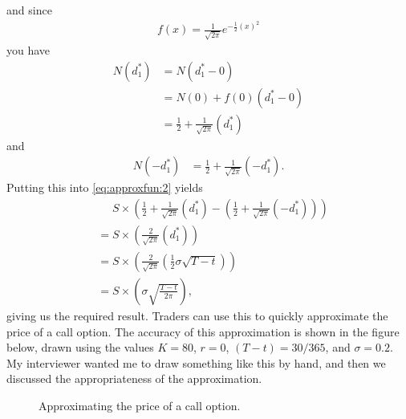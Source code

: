 \documentclass[11pt]{article}
\begin{document}
and since
\begin{align*}
f(x) =
     \frac{1}{ \sqrt{ 2\pi } }
     e^{ - \frac{1}{2} (x)^2 }
\end{align*}
you have
\begin{align*}
N(d_1^*)&= N(d_1^* - 0) \\
            &= N(0) + f(0)(d_1^* - 0) \\
            &= \frac{1}{2} +  \frac{1}{ \sqrt{ 2\pi } }
            (d_1^* )
\end{align*}
and
\begin{align*}
N(-d_1^*) &= \frac{1}{2} +  \frac{1}{ \sqrt{ 2\pi } } (- d_1^* )
\text{.}
\end{align*}
Putting this into \eqref{eq:approxfun:2} yields
\begin{align*}
&\phantom{{}={}}
S \times \left(
\frac{1}{2} +  \frac{1}{ \sqrt{ 2\pi } } ( d_1^* ) -
\left(
\frac{1}{2} +  \frac{1}{ \sqrt{ 2\pi } } (- d_1^* )
\right)
\right)
\\
&=
S \times \left(
    \frac{2}{ \sqrt{ 2\pi } } ( d_1^* )
\right)
\\
&=
S \times \left(
    \frac{ 2 }{ \sqrt{ 2 \pi } }
    \left(
    \frac{1}{2} \sigma \sqrt{T - t}
    \right)
\right)
\\
&=
S \times \left(
     \sigma
    \sqrt{\frac{ T - t }{  2 \pi  }}
\right)
\text{,}
\end{align*}
giving us the required result.
Traders can use this to quickly approximate the price of a call option.
The accuracy of this approximation is shown in the figure below, drawn using
the values
$K = 80$,
$r = 0$,
$(T-t) = 30/365$, and
$\sigma=0.2$.
My interviewer wanted me to draw something like this by hand, and then we discussed the appropriateness of the approximation.
%
%
%
\begin{figure}[!htb]
\begin{center}

\end{center}
\caption{Approximating the price of a call option.}
\label{fig:calloptionapprox}
\end{figure}
%
%
\end{document}
